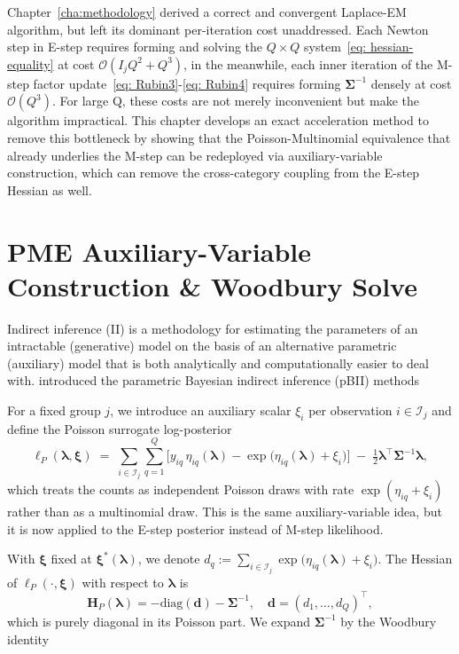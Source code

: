 Chapter~\ref{cha:methodology} derived a correct and convergent Laplace-EM algorithm, but left its dominant per-iteration cost unaddressed. Each Newton step in E-step requires forming and solving the $Q\times Q$ system~\eqref{eq: hessian-equality} at cost $\mathcal{O}(I_{j}Q^{2}+Q^{3})$, in the meanwhile, each inner iteration of the M-step factor update~\eqref{eq: Rubin3}-\eqref{eq: Rubin4} requires forming $\bm{\Sigma}^{-1}$ densely at cost $\mathcal{O}(Q^{3})$. For large Q, these costs are not merely inconvenient but make the algorithm impractical. This chapter develops an exact acceleration method to remove this bottleneck by showing that the Poisson-Multinomial equivalence that already underlies the M-step can be redeployed via auxiliary-variable construction, which can remove the cross-category coupling from the E-step Hessian as well. 

\section{PME Auxiliary-Variable Construction \& Woodbury Solve}
\label{sec:auxiliary-variable-construction}

Indirect inference (II) is a methodology for estimating the parameters of an intractable (generative) model on the basis of an alternative parametric (auxiliary) model that is both analytically and computationally easier to deal with. \citet{Drovandi_2015} introduced the parametric Bayesian indirect inference (pBII) methods 

For a fixed group $j$, we introduce an auxiliary scalar $\xi_{i}$ per observation $i\in \mathcal{I}_{j}$ and define the Poisson surrogate log-posterior
\begin{equation}
    \ell_P(\boldsymbol{\lambda}, \boldsymbol{\xi}) \;=\; \sum_{i \in \mathcal{I}_j} \sum_{q=1}^{Q} \Big[ y_{iq}\, \eta_{iq}(\boldsymbol{\lambda}) - \exp\big(\eta_{iq}(\boldsymbol{\lambda}) + \xi_i\big) \Big] \;-\; \tfrac{1}{2} \boldsymbol{\lambda}^\top \boldsymbol{\Sigma}^{-1} \boldsymbol{\lambda},
\end{equation}
which treats the counts as independent Poisson draws with rate $\exp{(\eta_{iq}+\xi_{i})}$ rather than as a multinomial draw. This is the same auxiliary-variable idea, but it is now applied to the E-step posterior instead of M-step likelihood.

With $\bm{\xi}$ fixed at $\bm{\xi}^{*}(\bm{\lambda})$, we denote $d_{q}:=\sum_{i\in \mathcal{I}_{j}}\exp{\bigl(\eta_{iq}(\bm{\lambda})+\xi_{i}\bigr)}$. The Hessian of $\ell_{P}(\cdot, \bm{\xi})$ with respect to $\bm{\lambda}$ is 
\begin{equation}
    \mathbf{H}_{P}(\bm{\lambda})=-\text{diag}(\mathbf{d})-\bm{\Sigma}^{-1}, \quad \mathbf{d}=(d_{1},\dots, d_{Q})^{\top},
    \label{eq:acceleration-hessian1}
\end{equation}
which is purely diagonal in its Poisson part. We expand $\bm{\Sigma}^{-1}$ by the Woodbury identity

